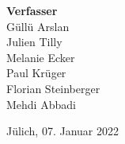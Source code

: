 \begin{titlepage}
  \vspace{2cm}

  \begin{center}
    {\Large \textbf{Verfasser}}\\[0.5cm]
    {\Large Güllü Arslan}\\[0.2cm]
    {\Large Julien Tilly}\\[0.2cm]
    {\Large Melanie Ecker}\\[0.2cm]
    {\Large Paul Krüger}\\[0.2cm]
    {\Large Florian Steinberger}\\[0.2cm]
    {\Large Mehdi Abbadi}\\

    \vspace{2cm}

    Jülich, 07. Januar 2022
  \end{center}

 

  \end{titlepage}

  \tableofcontents %